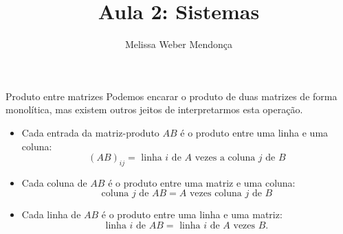 \documentclass{beamer}
\title{Aula 2: Sistemas}
\author{Melissa Weber Mendonça}
\begin{document}
\frame{\maketitle}

\begin{darkframes}

\begin{frame}{Produto entre matrizes}
    Podemos encarar o produto de duas matrizes de forma monolítica, mas existem outros jeitos de interpretarmos esta operação.
 \begin{itemize}
     \item<2->[(i)] Cada entrada da matriz-produto $AB$ é o produto entre uma linha e uma coluna:
     \begin{equation*}
         (AB)_{ij} = \mbox{ linha } i \mbox{ de } A \mbox{ vezes a coluna } j \mbox{ de } B
     \end{equation*}
     \item<3->[(ii)] Cada coluna de $AB$ é o produto entre uma matriz e uma coluna:
     \begin{equation*}
         \mbox{coluna } j \mbox{ de } AB = A \mbox{ vezes coluna } j \mbox{ de } B
     \end{equation*}
     \item<4->[(iii)] Cada linha de $AB$ é o produto entre uma linha e uma matriz:
     \begin{equation*}
         \mbox{linha } i \mbox{ de } AB = \mbox{ linha } i \mbox{ de } A \mbox{ vezes } B.
     \end{equation*}
 \end{itemize}
\end{frame}


\end{darkframes}
\end{document}
